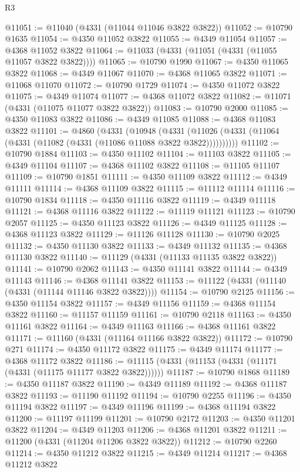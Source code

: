 \begin{lexlean}{R3}
\begin{coremodule}
@11051 := @11040 (@4331 (@11044 @11046 @3822 @3822))
@11052 := @10790 @1635
@11054 := @4350 @11052 @3822
@11055 := @4349 @11054
@11057 := @4368 @11052 @3822
@11064 := @11033 (@4331 (@11051 (@4331 (@11055 @11057 @3822 @3822))))
@11065 := @10790 @1990
@11067 := @4350 @11065 @3822
@11068 := @4349 @11067
@11070 := @4368 @11065 @3822
@11071 := @11068 @11070
@11072 := @10790 @1729
@11074 := @4350 @11072 @3822
@11075 := @4349 @11074
@11077 := @4368 @11072 @3822
@11082 := @11071 (@4331 (@11075 @11077 @3822 @3822))
@11083 := @10790 @2000
@11085 := @4350 @11083 @3822
@11086 := @4349 @11085
@11088 := @4368 @11083 @3822
@11101 := @4860
    (@4331
      (@10948
        (@4331 (@11026 (@4331 (@11064 (@4331 (@11082 (@4331 (@11086 @11088 @3822 @3822))))))))))
@11102 := @10790 @1884
@11103 := @4350 @11102
@11104 := @11103 @3822
@11105 := @4349 @11104
@11107 := @4368 @11102 @3822
@11108 := @11105 @11107
@11109 := @10790 @1851
@11111 := @4350 @11109 @3822
@11112 := @4349 @11111
@11114 := @4368 @11109 @3822
@11115 := @11112 @11114
@11116 := @10790 @1834
@11118 := @4350 @11116 @3822
@11119 := @4349 @11118
@11121 := @4368 @11116 @3822
@11122 := @11119 @11121
@11123 := @10790 @2057
@11125 := @4350 @11123 @3822
@11126 := @4349 @11125
@11128 := @4368 @11123 @3822
@11129 := @11126 @11128
@11130 := @10790 @2025
@11132 := @4350 @11130 @3822
@11133 := @4349 @11132
@11135 := @4368 @11130 @3822
@11140 := @11129 (@4331 (@11133 @11135 @3822 @3822))
@11141 := @10790 @2062
@11143 := @4350 @11141 @3822
@11144 := @4349 @11143
@11146 := @4368 @11141 @3822
@11153 := @11122 (@4331 (@11140 (@4331 (@11144 @11146 @3822 @3822))))
@11154 := @10790 @2125
@11156 := @4350 @11154 @3822
@11157 := @4349 @11156
@11159 := @4368 @11154 @3822
@11160 := @11157 @11159
@11161 := @10790 @2118
@11163 := @4350 @11161 @3822
@11164 := @4349 @11163
@11166 := @4368 @11161 @3822
@11171 := @11160 (@4331 (@11164 @11166 @3822 @3822))
@11172 := @10790 @271
@11174 := @4350 @11172 @3822
@11175 := @4349 @11174
@11177 := @4368 @11172 @3822
@11186 := @11115 (@4331 (@11153 (@4331 (@11171 (@4331 (@11175 @11177 @3822 @3822))))))
@11187 := @10790 @1868
@11189 := @4350 @11187 @3822
@11190 := @4349 @11189
@11192 := @4368 @11187 @3822
@11193 := @11190 @11192
@11194 := @10790 @2255
@11196 := @4350 @11194 @3822
@11197 := @4349 @11196
@11199 := @4368 @11194 @3822
@11200 := @11197 @11199
@11201 := @10790 @2172
@11203 := @4350 @11201 @3822
@11204 := @4349 @11203
@11206 := @4368 @11201 @3822
@11211 := @11200 (@4331 (@11204 @11206 @3822 @3822))
@11212 := @10790 @2260
@11214 := @4350 @11212 @3822
@11215 := @4349 @11214
@11217 := @4368 @11212 @3822

\end{coremodule}
\end{lexlean}
